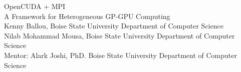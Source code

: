 \begin{block}{}
\Huge{\textcolor{solarizedAccent}{OpenCUDA + MPI}}\hfill{}\\{}
\huge{A Framework for Heterogeneous GP-GPU Computing}\hfill{}\\{}
\large{Kenny Ballou, Boise State University Department of Computer
Science\hfill{}\\{}
Nilab Mohammad Mousa, Boise State University Department of Computer
Science\hfill{}\\{}
Mentor: Alark Joshi, PhD. Boise State University Department
of Computer Science\hfill{}\\{}}
\end{block}
